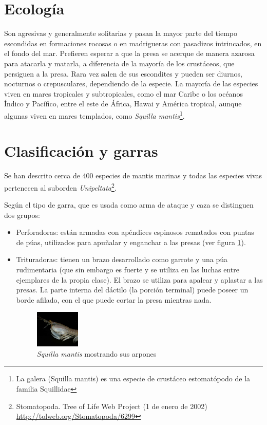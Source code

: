 \documentclass[10pt,twocolumn]{article}
\begin{document}
\section{Ecología}

Son agresivas y generalmente solitarias y pasan la mayor parte del tiempo escondidas en formaciones rocosas o en madrigueras con pasadizos intrincados, en el fondo del mar. Prefieren esperar a que la presa se acerque de manera azarosa para atacarla y matarla, a diferencia de la mayoría de los crustáceos, que persiguen a la presa. Rara vez salen de sus escondites y pueden ser diurnos, nocturnos o crepusculares, dependiendo de la especie. La mayoría de las especies viven en mares tropicales y subtropicales, como el mar Caribe o los océanos Índico y Pacífico, entre el este de África, Hawai y América tropical, aunque algunas viven en mares templados, como \textit{Squilla mantis}\footnote {La galera (Squilla mantis) es una especie de crustáceo estomatópodo de la familia Squillidae}.

\section{Clasificación y garras
}
Se han descrito cerca de 400 especies de mantis ma\-ri\-nas y todas las especies vivas pertenecen al sub\-or\-den \textit{Unipeltata}\footnote{Stomatopoda. Tree of Life Web Project (1 de enero de 2002) \url{http://tolweb.org/Stomatopoda/6299}}.

Según el tipo de garra, que es usada como arma de ataque y caza se distinguen dos grupos:

\begin{itemize}
	\item  Perforadoras: están armadas con apéndices espinosos rematados con puntas de púas, utilizados para apuñalar y enganchar a las presas (ver figura \ref{fig:dos}).
	\item Trituradoras: tienen un brazo desarrollado como garrote y una púa rudimentaria (que sin embargo es fuerte y se utiliza en las luchas entre ejemplares de la propia clase). El brazo se utiliza para apalear y aplastar a las presas. La parte interna del dáctilo (la porción terminal) puede poseer un borde afilado, con el que puede cortar la presa mientras nada.
\begin{figure}[h] 
	\centering
	\includegraphics[width=0.2\textwidth]{img/squilla_mantis.jpg}
	\caption{\textit{Squilla mantis}  mostrando sus arpones}
	\label{fig:dos}
\end{figure}
\end{itemize}
\end{document}
